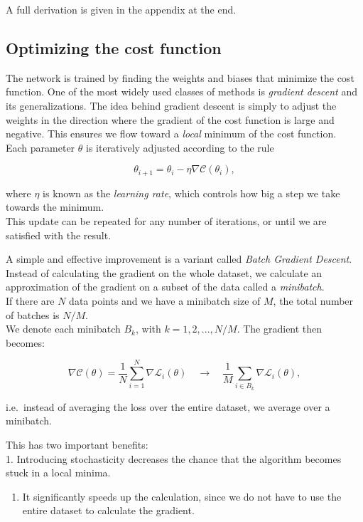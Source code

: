 \documentclass[11pt]{article}
\providecommand{\tightlist}{%
      \setlength{\itemsep}{0pt}\setlength{\parskip}{0pt}}
\begin{document}
A full derivation is given in the appendix at the end.

\hypertarget{optimizing-the-cost-function}{%
\subsection{Optimizing the cost
function}\label{optimizing-the-cost-function}}

The network is trained by finding the weights and biases that minimize
the cost function. One of the most widely used classes of methods is
\emph{gradient descent} and its generalizations. The idea behind
gradient descent is simply to adjust the weights in the direction where
the gradient of the cost function is large and negative. This ensures we
flow toward a \emph{local} minimum of the cost function.\\
Each parameter \(\theta\) is iteratively adjusted according to the rule

\[ \theta_{i+1} = \theta_i - \eta \nabla \mathcal{C}(\theta_i) ,\]

where \(\eta\) is known as the \emph{learning rate}, which controls how
big a step we take towards the minimum.\\
This update can be repeated for any number of iterations, or until we
are satisfied with the result.

A simple and effective improvement is a variant called \emph{Batch
Gradient Descent}.\\
Instead of calculating the gradient on the whole dataset, we calculate
an approximation of the gradient on a subset of the data called a
\emph{minibatch}.\\
If there are \(N\) data points and we have a minibatch size of \(M\),
the total number of batches is \(N/M\).\\
We denote each minibatch \(B_k\), with \(k = 1, 2,...,N/M\). The
gradient then becomes:

\[ \nabla \mathcal{C}(\theta) = \frac{1}{N} \sum_{i=1}^N \nabla \mathcal{L}_i(\theta) \quad \rightarrow \quad
\frac{1}{M} \sum_{i \in B_k} \nabla \mathcal{L}_i(\theta) ,\]

i.e.~instead of averaging the loss over the entire dataset, we average
over a minibatch.

This has two important benefits:\\
1. Introducing stochasticity decreases the chance that the algorithm
becomes stuck in a local minima.

\begin{enumerate}
\def\labelenumi{\arabic{enumi}.}
\setcounter{enumi}{1}
\tightlist
\item
  It significantly speeds up the calculation, since we do not have to
  use the entire dataset to calculate the gradient.
\end{enumerate}
\end{document}
